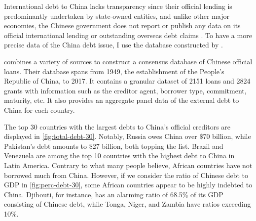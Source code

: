 International debt to China lacks transparency since their official lending is predominantly undertaken by state-owned entities, and unlike other major economies, the Chinese government does not report or publish any data on its official international lending or outstanding overseas debt claims \citep*{Horn-Reinhart-Trebesch-21}.
To have a more precise data of the China debt issue, I use the database constructed by \citet*{Horn-Reinhart-Trebesch-21}.


\citet*{Horn-Reinhart-Trebesch-21} combines a variety of sources to construct a consensus database of Chinese official loans.
Their database spans from 1949, the establishment of the People's Republic of China, to 2017. It contains a granular dataset of 2151 loans and 2824 grants with information such as the creditor agent, borrower type, commitment, maturity, etc. It also provides an aggregate panel data of the external debt to China for each country.

The top 30 countries with the largest debts to China's official creditors are displayed in \autoref{fig:total-debt-30}. Notably, Russia owes China over \$70 billion, while Pakistan's debt amounts to \$27 billion, both topping the list. Brazil and Venezuela are among the top 10 countries with the highest debt to China in Latin America. Contrary to what many people believe, African countries have not borrowed much from China. However, if we consider the ratio of Chinese debt to GDP in \autoref{fig:perc-debt-30}, some African countries appear to be highly indebted to China. Djibouti, for instance, has an alarming ratio of 68.5\% of its GDP consisting of Chinese debt, while Tonga, Niger, and Zambia have ratios exceeding 10\%.

